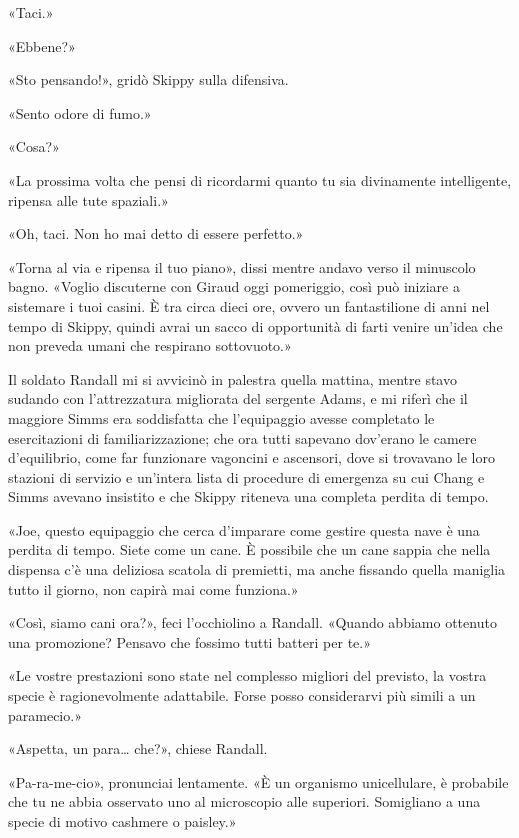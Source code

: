 «Taci.»

«Ebbene?»

«Sto pensando!», gridò Skippy sulla difensiva.

«Sento odore di fumo.»

«Cosa?»

«La prossima volta che pensi di ricordarmi quanto tu sia divinamente
intelligente, ripensa alle tute spaziali.»

«Oh, taci. Non ho mai detto di essere perfetto.»

«Torna al via e ripensa il tuo piano», dissi mentre andavo verso il
minuscolo bagno. «Voglio discuterne con Giraud oggi pomeriggio, così può
iniziare a sistemare i tuoi casini. È tra circa dieci ore, ovvero un
fantastilione di anni nel tempo di Skippy, quindi avrai un sacco di
opportunità di farti venire un'idea che non preveda umani che respirano
sottovuoto.»

\hfill\break

Il soldato Randall mi si avvicinò in palestra quella mattina, mentre
stavo sudando con l'attrezzatura migliorata del sergente Adams, e mi
riferì che il maggiore Simms era soddisfatta che l'equipaggio avesse
completato le esercitazioni di familiarizzazione; che ora tutti sapevano
dov'erano le camere d'equilibrio, come far funzionare vagoncini e
ascensori, dove si trovavano le loro stazioni di servizio e un'intera
lista di procedure di emergenza su cui Chang e Simms avevano insistito e
che Skippy riteneva una completa perdita di tempo.

«Joe, questo equipaggio che cerca d'imparare come gestire questa nave è
una perdita di tempo. Siete come un cane. È possibile che un cane sappia
che nella dispensa c'è una deliziosa scatola di premietti, ma anche
fissando quella maniglia tutto il giorno, non capirà mai come funziona.»

«Così, siamo cani ora?», feci l'occhiolino a Randall. «Quando abbiamo
ottenuto una promozione? Pensavo che fossimo tutti batteri per te.»

«Le vostre prestazioni sono state nel complesso migliori del previsto,
la vostra specie è ragionevolmente adattabile. Forse posso considerarvi
più simili a un paramecio.»

«Aspetta, un para\ldots{} che?», chiese Randall.

«Pa-ra-me-cio», pronunciai lentamente. «È un organismo unicellulare, è
probabile che tu ne abbia osservato uno al microscopio alle superiori.
Somigliano a una specie di motivo cashmere o paisley.»

